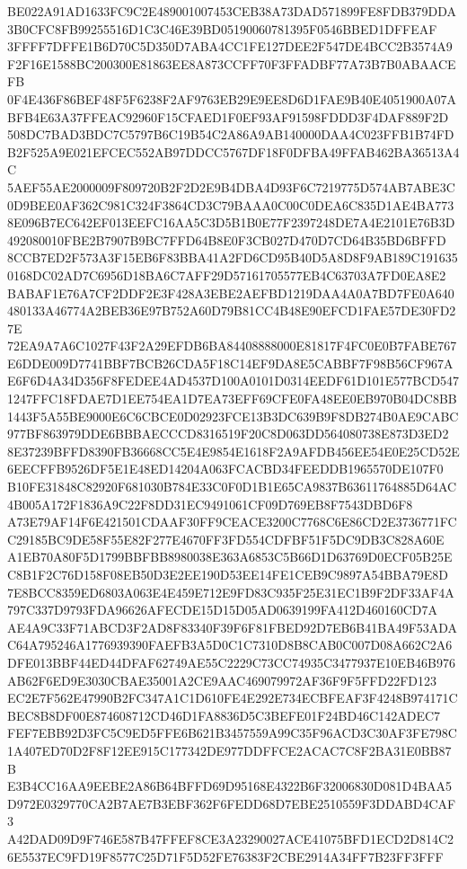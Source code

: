 \documentclass[UTF8,fontset=fandol,zihao=-4,a4paper]{ctexart}
\begin{document}
{{BE022A91AD1633FC9C2E489001007453CEB38A73DAD571899FE8FDB379DDA3B0CFC8FB99255516D1C3C46E39BD05190060781395F0546BBED1DFFEAF
3FFFF7DFFE1B6D70C5D350D7ABA4CC1FE127DEE2F547DE4BCC2B3574A9F2F16E1588BC200300E81863EE8A873CCFF70F3FFADBF77A73B7B0ABAACEFB
0F4E436F86BEF48F5F6238F2AF9763EB29E9EE8D6D1FAE9B40E4051900A07ABFB4E63A37FFEAC92960F15CFAED1F0EF93AF91598FDDD3F4DAF889F2D
508DC7BAD3BDC7C5797B6C19B54C2A86A9AB140000DAA4C023FFB1B74FDB2F525A9E021EFCEC552AB97DDCC5767DF18F0DFBA49FFAB462BA36513A4C
5AEF55AE2000009F809720B2F2D2E9B4DBA4D93F6C7219775D574AB7ABE3C0D9BEE0AF362C981C324F3864CD3C79BAAA0C00C0DEA6C835D1AE4BA773
8E096B7EC642EF013EEFC16AA5C3D5B1B0E77F2397248DE7A4E2101E76B3D492080010FBE2B7907B9BC7FFD64B8E0F3CB027D470D7CD64B35BD6BFFD
8CCB7ED2F573A3F15EB6F83BBA41A2FD6CD95B40D5A8D8F9AB189C1916350168DC02AD7C6956D18BA6C7AFF29D57161705577EB4C63703A7FD0EA8E2
BABAF1E76A7CF2DDF2E3F428A3EBE2AEFBD1219DAA4A0A7BD7FE0A640480133A46774A2BEB36E97B752A60D79B81CC4B48E90EFCD1FAE57DE30FD27E
72EA9A7A6C1027F43F2A29EFDB6BA84408888000E81817F4FC0E0B7FABE767E6DDE009D7741BBF7BCB26CDA5F18C14EF9DA8E5CABBF7F98B56CF967A
E6F6D4A34D356F8FEDEE4AD4537D100A0101D0314EEDF61D101E577BCD5471247FFC18FDAE7D1EE754EA1D7EA73EFF69CFE0FA48EE0EB970B04DC8BB
1443F5A55BE9000E6C6CBCE0D02923FCE13B3DC639B9F8DB274B0AE9CABC977BF863979DDE6BBBAECCCD8316519F20C8D063DD564080738E873D3ED2
8E37239BFFD8390FB36668CC5E4E9854E1618F2A9AFDB456EE54E0E25CD52E6EECFFB9526DF5E1E48ED14204A063FCACBD34FEEDDB1965570DE107F0
B10FE31848C82920F681030B784E33C0F0D1B1E65CA9837B63611764885D64AC4B005A172F1836A9C22F8DD31EC9491061CF09D769EB8F7543DBD6F8
A73E79AF14F6E421501CDAAF30FF9CEACE3200C7768C6E86CD2E3736771FCC29185BC9DE58F55E82F277E4670FF3FD554CDFBF51F5DC9DB3C828A60E
A1EB70A80F5D1799BBFBB8980038E363A6853C5B66D1D63769D0ECF05B25EC8B1F2C76D158F08EB50D3E2EE190D53EE14FE1CEB9C9897A54BBA79E8D
7E8BCC8359ED6803A063E4E459E712E9FD83C935F25E31EC1B9F2DF33AF4A797C337D9793FDA96626AFECDE15D15D05AD0639199FA412D460160CD7A
AE4A9C33F71ABCD3F2AD8F83340F39F6F81FBED92D7EB6B41BA49F53ADAC64A795246A1776939390FAEFB3A5D0C1C7310D8B8CAB0C007D08A662C2A6
DFE013BBF44ED44DFAF62749AE55C2229C73CC74935C3477937E10EB46B976AB62F6ED9E3030CBAE35001A2CE9AAC469079972AF36F9F5FFD22FD123
EC2E7F562E47990B2FC347A1C1D610FE4E292E734ECBFEAF3F4248B974171CBEC8B8DF00E874608712CD46D1FA8836D5C3BEFE01F24BD46C142ADEC7
FEF7EBB92D3FC5C9ED5FFE6B621B3457559A99C35F96ACD3C30AF3FE798C1A407ED70D2F8F12EE915C177342DE977DDFFCE2ACAC7C8F2BA31E0BB87B
E3B4CC16AA9EEBE2A86B64BFFD69D95168E4322B6F32006830D081D4BAA5D972E0329770CA2B7AE7B3EBF362F6FEDD68D7EBE2510559F3DDABD4CAF3
A42DAD09D9F746E587B47FFEF8CE3A23290027ACE41075BFD1ECD2D814C26E5537EC9FD19F8577C25D71F5D52FE76383F2CBE2914A34FF7B23FF3FFF
}}
\end{document}
